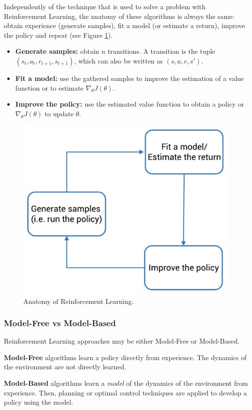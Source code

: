 Independently of the technique that is used to solve a problem with Reinforcement Learning, the anatomy of these algorithms is always the same: obtain experience (generate samples), fit a model (or estimate a return), improve the policy and repeat (see Figure \ref{fig:RL_anatomy}). 

\begin{itemize}
    \item \textbf{Generate samples:} obtain $n$ transitions. A transition is the tuple $(s_{t}, a_{t}, r_{t+1}, s_{t+1})$, which can also be written as $(s, a, r, s')$.
    \item \textbf{Fit a model:} use the gathered samples to improve the estimation of a value function or to estimate $\nabla_{\theta} J(\theta)$.
    \item \textbf{Improve the policy:} use the estimated value function to obtain a policy or $\nabla_{\theta} J(\theta)$ to update $\theta$.
\end{itemize}

\begin{figure}[h]
    \centering
    \includegraphics[width=0.6\linewidth]{imagenes/cap1/RL_anatomy.pdf}
    \caption{Anatomy of Reinforcement Learning.}
    \label{fig:RL_anatomy}
\end{figure}

\subsubsection{Model-Free vs Model-Based}
Reinforcement Learning approaches may be either Model-Free or Model-Based.

\textbf{Model-Free} algorithms learn a policy directly from experience. The dynamics of the environment are not directly learned.

\textbf{Model-Based} algorithms learn a \emph{model} of the dynamics of the environment from experience. Then, planning or optimal control techniques are applied to develop a policy using the model.

